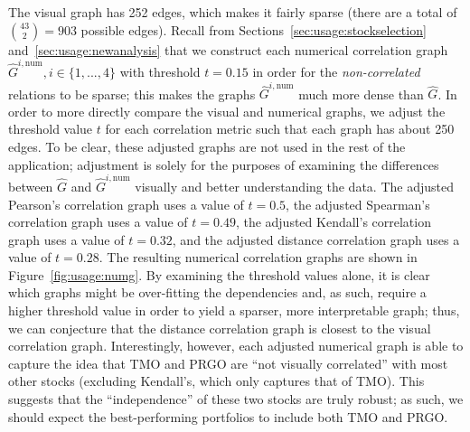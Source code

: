The visual graph has 252 edges, which makes it fairly sparse (there are a total 
of ${43\choose 2} = 903$ possible edges). Recall from 
Sections~\ref{sec:usage:stockselection} and~\ref{sec:usage:newanalysis} that we 
construct each numerical correlation graph $\hat{G}^{i,\text{num}}, i\in 
\{1,...,4\}$ with threshold $t = 0.15$ in order for the \textit{non-correlated} 
relations to be sparse; this makes the graphs $\hat{G}^{i,\text{num}}$ much 
more dense than $\hat{G}$. 
In order to more directly compare the visual and numerical graphs, we adjust 
the threshold value $t$ for each correlation metric such that each graph has 
about 250 edges. To be clear, these adjusted graphs are not used in the rest of 
the application; adjustment is solely for the purposes of examining the 
differences between $\hat{G}$ and $\hat{G}^{i,\text{num}}$ visually and better 
understanding the data. 
The adjusted Pearson's correlation graph uses a value of $t = 0.5$, the 
adjusted Spearman's correlation graph uses a value of $t = 0.49$, the adjusted 
Kendall's correlation graph uses a value of $t = 0.32$, and the adjusted 
distance correlation graph uses a value of $t = 0.28$. 
The resulting numerical correlation graphs are shown in 
Figure~\ref{fig:usage:numg}. By examining the 
threshold values alone, it is clear which graphs might be over-fitting the 
dependencies and, as such, require a higher threshold value in order to yield a 
sparser, more interpretable graph; thus, we can conjecture that the distance 
correlation graph is closest to the visual correlation graph. Interestingly, 
however, each adjusted numerical graph is able to capture the idea that TMO and 
PRGO are ``not visually correlated'' with most other stocks (excluding 
Kendall's, which only captures that of TMO). This 
suggests that the ``independence'' of these two stocks 
are truly robust; as such, we should expect the best-performing portfolios to 
include both TMO and PRGO.

